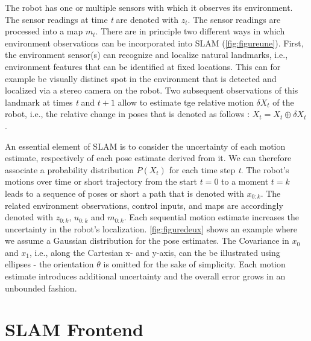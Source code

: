 \documentclass{article}
\begin{document}
The robot has one or multiple sensors with which it observes its environment. The sensor readings at time \textit{t} are denoted with $\mathit{z_{t}}$. The sensor readings are processed into a map $\mathit{m_{t}}$. There are in principle two different ways in which environment observations can be incorporated into SLAM (\cref{fig:figureune}). First, the environment sensor(s) can recognize and localize natural landmarks, i.e., environment features that can be identified at fixed locations. This can for example be visually distinct spot in the environment that is detected and localized via a stereo camera on the robot. Two subsequent observations of this landmark at times \textit{t} and $\mathit{t}+1$ allow to estimate tge relative motion $\delta X_{t}$ of the robot, i.e., the relative change in poses that is denoted as follows : $X_{t} = X_{t} \oplus \delta X_{t}$.

An essential element of SLAM is to consider the uncertainty of each motion estimate, respectively of each pose estimate derived from it. We can therefore associate a probability distribution $\mathit{P}\left(X_{t}\right)$ for each time step \textit{t}. The robot's motions over time or short trajectory from the start $\mathit{t} = 0$ to a moment $\mathit{t} = \mathit{k}$ leads to a sequence of poses or short a path that is denoted with $x_{0:\mathit{k}}$. The related environment observations, control inputs, and maps are accordingly denoted with $z_{0:\mathit{k}}$, $u_{0:\mathit{k}}$ and $m_{0:\mathit{k}}$. Each sequential motion estimate increases the uncertainty in the robot's localization. \cref{fig:figuredeux} shows an example where we assume a Gaussian distribution for the pose estimates. The Covariance in $\mathit{x_{0}}$ and $\mathit{x_{1}}$, i.e., along the Cartesian x- and y-axis, can the be illustrated using ellipses - the orientation $\theta$ is omitted for the sake of simplicity. Each motion estimate introduces additional uncertainty and the overall error grows in an unbounded fashion. 

\section{SLAM Frontend}
\end{document}
